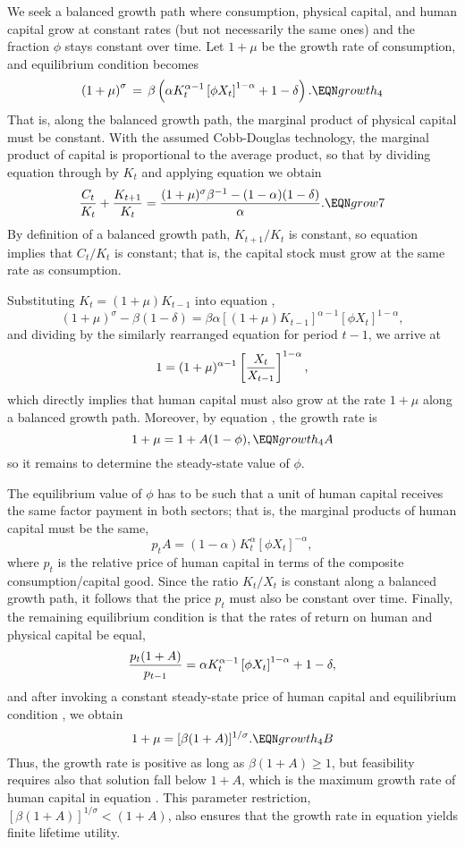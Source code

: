 We seek a balanced growth path where consumption, physical capital, and
human capital grow at constant rates (but not necessarily the same ones) and
the fraction $\phi$ stays constant over time. Let $1+\mu$ be the growth
rate of consumption, and equilibrium condition  becomes
$$
\left( 1+\mu \right)^\sigma \,=\, \beta \left(\alpha K_{t}^{\alpha-1}
               \left[\phi X_{t}\right]^{1-\alpha} +1 - \delta \right).
                                                            \EQN growth_4
$$
That is, along the balanced growth path, the marginal product of physical
capital must be constant. With the assumed Cobb-Douglas technology, the
marginal product of capital is proportional to the average product, so
that by  dividing equation
 through by $K_t$ and applying equation 
we obtain
$$
{C_t \over K_t} + {K_{t+1} \over K_t} =
{(1+\mu)^\sigma \beta^{-1} - (1-\alpha)(1-\delta) \over \alpha}. \EQN grow7
$$
By definition of a balanced growth path, $K_{t+1}/K_t$ is constant, so
equation  implies that $C_t/K_t$ is constant; that is, the
capital stock must grow at the same rate as consumption.

Substituting $K_t=(1+\mu)K_{t-1}$ into equation ,
$$
\left( 1+\mu \right)^\sigma - \beta (1 - \delta) =
       \beta \alpha \left[(1+\mu)K_{t-1}\right]^{\alpha-1}
               \left[\phi X_{t}\right]^{1-\alpha},
$$
and dividing by the similarly rearranged equation
 for period $t-1$, we
arrive at
$$
1=(1+\mu)^{\alpha-1} \left[{X_t \over X_{t-1}}\right]^{1-\alpha},
$$
which directly implies that human capital must also grow at the rate
$1+\mu$ along a balanced growth path. Moreover, by equation ,
the growth rate is
$$
1+\mu = 1 + A(1-\phi),                                    \EQN growth_4A
$$
so it remains to determine the steady-state value of $\phi$.

The equilibrium value of $\phi$ has to be such that a unit of human capital
receives the same factor payment in both sectors; that is,
 the marginal products
of human capital must be the same,
$$
p_t A = (1-\alpha) K_t^\alpha \left[\phi X_t\right]^{-\alpha},
$$
where $p_t$ is the relative price of human capital in terms of the composite
consumption/capital good. Since the ratio $K_t/X_t$ is constant along a
balanced growth path, it follows that the price $p_t$ must also be constant
over time. Finally, the remaining equilibrium condition is that the rates of
return on human and physical capital be equal,
$$
{p_{t}(1+A) \over p_{t-1}} = \alpha K_{t}^{\alpha-1}
               \left[\phi X_{t}\right]^{1-\alpha} +1 - \delta ,
$$
and after invoking a constant steady-state price of human capital and
equilibrium condition , we obtain
$$
1+\mu = [\beta (1+A)]^{1/\sigma}.                            \EQN growth_4B
$$
Thus, the growth rate is positive as long as $\beta (1+A)\geq 1$,
but feasibility requires also that solution  fall below
$1+A$, which is the maximum growth rate of human capital in equation
.
This parameter restriction, $[\beta (1+A)]^{1/\sigma} < (1+A)$,
also ensures that the growth rate in
equation  yields finite lifetime utility.

